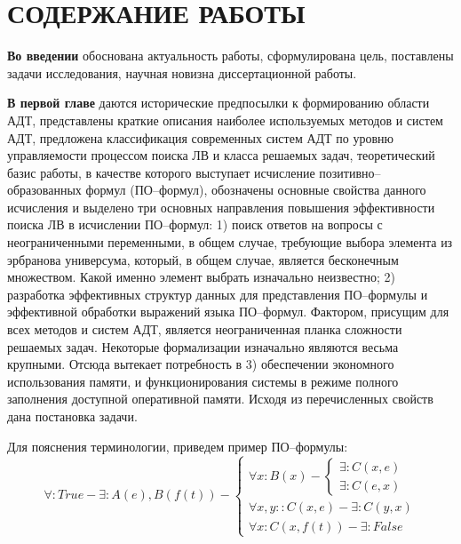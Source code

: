 \documentclass[a4paper]{report}
\begin{document}
\section*{СОДЕРЖАНИЕ РАБОТЫ}


\textbf{Во введении} обоснована актуальность работы, сформулирована цель, поставлены задачи исследования, научная новизна диссертационной работы.


\textbf{В первой главе} даются исторические предпосылки к формированию области АДТ, представлены краткие описания наиболее используемых методов и систем АДТ,  предложена классификация современных систем АДТ по уровню управляемости процессом поиска ЛВ и класса решаемых задач, теоретический базис работы, в качестве которого выступает исчисление позитивно--образованных формул (ПО--формул), обозначены основные свойства данного исчисления и выделено три основных направления повышения эффективности поиска ЛВ в исчислении ПО--формул: 1) поиск ответов на вопросы с неограниченными переменными, в общем случае, требующие выбора элемента из эрбранова универсума, который, в общем случае, является бесконечным множеством. Какой именно элемент выбрать изначально неизвестно; 2) разработка эффективных структур данных для представления ПО--формулы и эффективной обработки выражений языка ПО--формул. Фактором, присущим для всех методов и систем АДТ, является неограниченная планка сложности решаемых задач. Некоторые формализации изначально являются весьма крупными. Отсюда вытекает потребность в 3) обеспечении экономного использования памяти, и функционирования системы в режиме полного заполнения доступной оперативной памяти. Исходя из перечисленных свойств дана постановка задачи.

Для пояснения терминологии, приведем пример ПО--формулы:
$$
\forall\colon True - \exists: A(e),B(f(t)) - \left\{
\begin{array}{lcl}
 \forall x \colon B(x) - \left\{
     \begin{array}{lcl}
     \exists \colon C(x,e) \\
     \exists \colon C(e,x)
    \end{array}\right. \\
 \forall x,y \colon \colon C(x,e) - \exists : C(y,x) \\
 \forall x \colon C(x,f(t)) - \exists : False
\end{array}
\right.
$$
\end{document}
